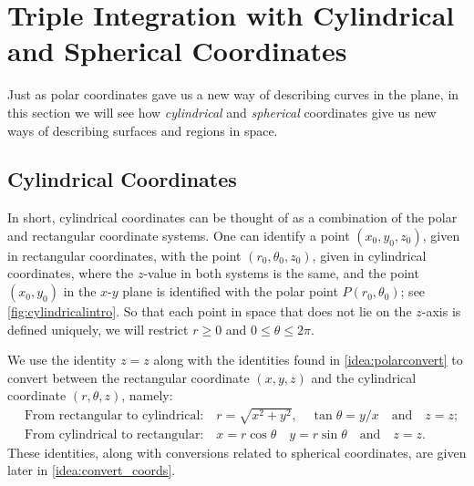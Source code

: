\section{Triple Integration with Cylindrical and Spherical Coordinates}\label{sec:cylindrical_spherical}

Just as polar coordinates gave us a new way of describing curves in the plane, in this section we will see how \emph{cylindrical} and \emph{spherical} coordinates give us new ways of describing surfaces and regions in space.


\subsection{Cylindrical Coordinates}

In short, cylindrical coordinates can be thought of as a combination of the polar and rectangular coordinate systems. %
One can identify a point $(x_0,y_0,z_0)$, given in rectangular coordinates, with the point $(r_0,\theta_0,z_0)$, given in cylindrical coordinates, where the $z$-value in both systems is the same, and the point $(x_0,y_0)$ in the $x$-$y$ plane is identified with the polar point $P(r_0,\theta_0)$; see \autoref{fig:cylindricalintro}. So that each point in space that does not lie on the $z$-axis is defined uniquely, we will restrict $r\geq 0$ and $0\leq \theta\leq 2\pi$.

We use the identity $z=z$ along with the identities found in \autoref{idea:polarconvert} to convert between the  rectangular coordinate $(x,y,z)$ and the  cylindrical coordinate $(r,\theta,z)$, namely:
\begin{align*}
&\text{From rectangular to cylindrical:}\quad r=\sqrt{x^2+y^2},\quad \tan\theta = y/x \quad\text{and}\quad z=z;\\
&\text{From cylindrical to rectangular:} \quad x=r\cos\theta\quad y=r\sin\theta\quad \text{and}\quad z=z.
\end{align*}
These identities, along with conversions related to spherical coordinates, are given later in \autoref{idea:convert_coords}.

